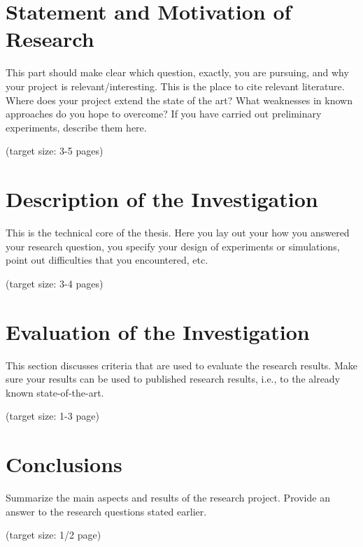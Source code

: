 \documentclass[a4paper,11pt,oneside]{article}
\begin{document}
  
  
  
  
  

  \section{Statement and Motivation of Research}

  This part should make clear which question, exactly, you are
  pursuing, and why your project is relevant/interesting. This is the
  place to cite relevant literature. Where does your project extend
  the state of the art? What weaknesses in known approaches do you
  hope to overcome? If you have carried out preliminary experiments,
  describe them here.

  (target size: 3-5 pages)

  \section{Description of the Investigation}

  This is the technical core of the thesis. Here you lay out your how
  you answered your research question, you specify your design of
  experiments or simulations, point out difficulties that you
  encountered, etc.

  (target size: 3-4 pages)

  \section{Evaluation of the Investigation}

  This section discusses criteria that are used to evaluate the
  research results. Make sure your results can be used to published
  research results, i.e., to the already known state-of-the-art.

  (target size: 1-3 page)

  \section{Conclusions}

  Summarize the main aspects and results of the research
  project. Provide an answer to the research questions stated earlier.

  (target size: 1/2 page)

  \nocite{JS06}

  \newpage
  
  
\end{document}
